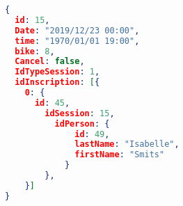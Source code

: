 \begin{lstlisting}[language=json,firstnumber=1]
{
  id: 15,
  Date: "2019/12/23 00:00",
  time: "1970/01/01 19:00",
  bike: 8,
  Cancel: false,
  IdTypeSession: 1,
  idInscription: [{
  	0: {
  	  id: 45,
		idSession: 15,
		  idPerson: {
			  id: 49,
			  lastName: "Isabelle",
			  firstName: "Smits"
			}
		},
	}]
}
\end{lstlisting}